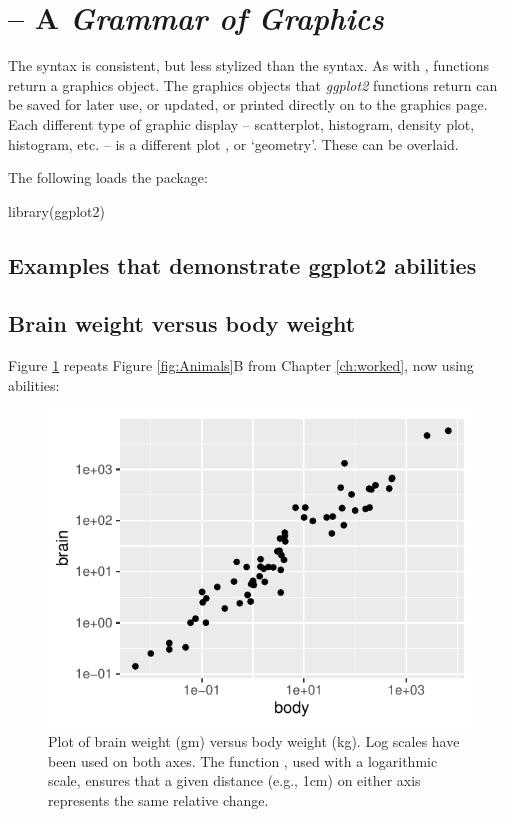\section{ -- A \textit{Grammar of  Graphics}}\label{sec:ggplot}


The  syntax is consistent, but less stylized than the
 syntax.  As with , 
functions return a graphics object. The graphics objects that {\em
    ggplot2} functions return can be saved for later use, or updated,
  or printed directly on to the graphics page. Each different type of
 graphic display -- scatterplot, histogram, density plot,
histogram, etc. -- is a different plot , or
`geometry'.  These can be overlaid.

The following loads the  package:
\begin{Schunk}
\begin{Sinput}
library(ggplot2)
\end{Sinput}
\end{Schunk}

\subsection{Examples that demonstrate ggplot2 abilities}

\subsection*{Brain weight versus body weight}
Figure \ref{fig:ggplot2-brain} repeats Figure \ref{fig:Animals}B from Chapter
\ref{ch:worked}, now using  abilities:
\begin{figure}
\begin{Schunk}


\centerline{\includegraphics[width=0.7\linewidth]{figs/07-ggplot2-brain-1} }

\end{Schunk}
\caption{Plot of brain weight (gm) versus body weight (kg).
Log scales have been used on both axes.  The function
, used with a logarithmic scale, ensures
that a given distance (e.g., 1cm) on either axis represents
the same relative change.\label{fig:ggplot2-brain}}
\end{figure}

